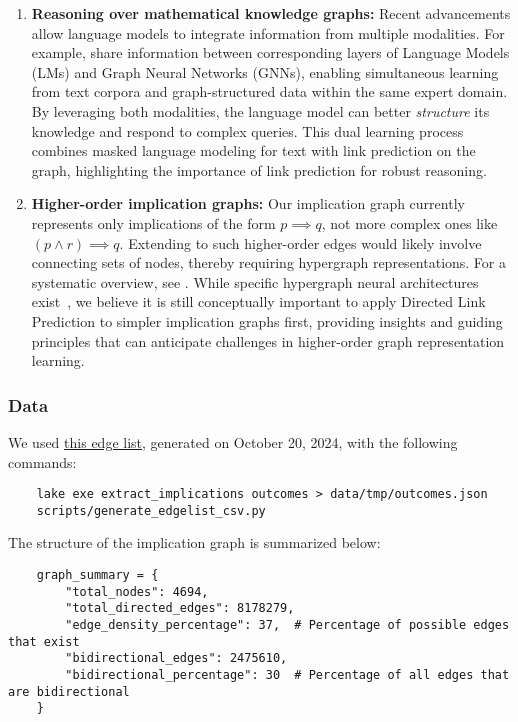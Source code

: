 \begin{enumerate}
    \item \textbf{Reasoning over mathematical knowledge graphs:} Recent advancements allow language
    models to integrate information from multiple modalities. For example,
    \cite{Zhang2022, Yasunaga2022} share information between corresponding layers of Language Models (LMs)
    and Graph Neural Networks (GNNs), enabling simultaneous learning from text corpora and graph-structured
    data within the same expert domain. By leveraging both modalities, the language model can better
    \emph{structure} its knowledge and respond to complex queries. This dual learning process combines
    masked language modeling for text with link prediction on the graph, highlighting the importance
    of link prediction for robust reasoning.
    \item \textbf{Higher-order implication graphs:} Our implication graph currently represents only
    implications of the form $p \implies q$, not more complex ones like $(p \land r) \implies q$.
    Extending to such higher-order edges would likely involve connecting sets of nodes, thereby
    requiring hypergraph representations. For a systematic overview, see \cite{Kivela2014}.
    While specific hypergraph neural architectures exist~\cite{Feng2019}, we believe it is still
    conceptually important to apply Directed Link Prediction to simpler implication graphs first,
    providing insights and guiding principles that can anticipate challenges in higher-order graph
    representation learning.
\end{enumerate}

\subsubsection{Data}

We used \href{https://github.com/teorth/equational_theories/blob/main/data/2024-10-20-edge_list.csv.zip}{this edge list},
generated on October 20, 2024, with the following commands:

\begin{verbatim}
    lake exe extract_implications outcomes > data/tmp/outcomes.json
    scripts/generate_edgelist_csv.py
\end{verbatim}

The structure of the implication graph is summarized below:

\begin{verbatim}
    graph_summary = {
        "total_nodes": 4694,
        "total_directed_edges": 8178279,
        "edge_density_percentage": 37,  # Percentage of possible edges that exist
        "bidirectional_edges": 2475610,
        "bidirectional_percentage": 30  # Percentage of all edges that are bidirectional
    }
\end{verbatim}

